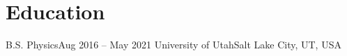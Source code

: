 \section{Education}
\mySubHeadingListStart

  \mySubHeading
    {B.S. Physics}{Aug 2016 -- May 2021}
    {University of Utah}{Salt Lake City, UT, USA}
    \myItemListStart
    \myItemListEnd

\mySubHeadingListEnd
